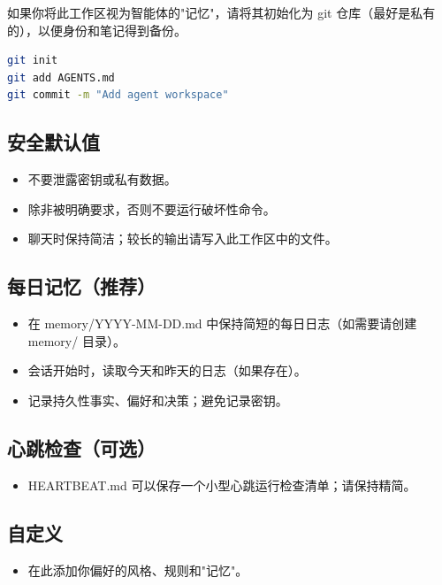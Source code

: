 如果你将此工作区视为智能体的"记忆"，请将其初始化为 git 仓库（最好是私有的），以便身份和笔记得到备份。

\begin{lstlisting}[language=bash]
git init
git add AGENTS.md
git commit -m "Add agent workspace"
\end{lstlisting}


\subsection{安全默认值}


\begin{itemize}
  \item 不要泄露密钥或私有数据。
  \item 除非被明确要求，否则不要运行破坏性命令。
  \item 聊天时保持简洁；较长的输出请写入此工作区中的文件。
\end{itemize}


\subsection{每日记忆（推荐）}


\begin{itemize}
  \item 在 memory/YYYY-MM-DD.md 中保持简短的每日日志（如需要请创建 memory/ 目录）。
  \item 会话开始时，读取今天和昨天的日志（如果存在）。
  \item 记录持久性事实、偏好和决策；避免记录密钥。
\end{itemize}


\subsection{心跳检查（可选）}


\begin{itemize}
  \item HEARTBEAT.md 可以保存一个小型心跳运行检查清单；请保持精简。
\end{itemize}


\subsection{自定义}


\begin{itemize}
  \item 在此添加你偏好的风格、规则和"记忆"。
\end{itemize}


